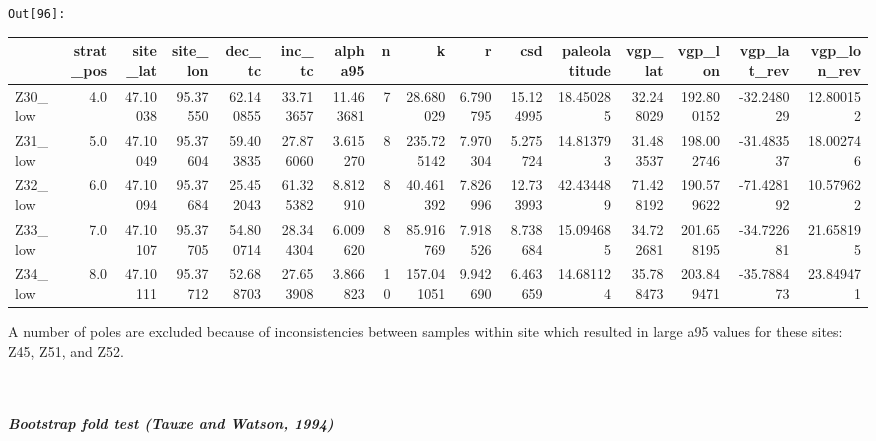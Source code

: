 \documentclass[11pt]{article}
\begin{document}
\texttt{\color{outcolor}Out[{\color{outcolor}96}]:}
\begin{sidewaystable}    
    {\tiny\begin{tabular}{lrrrrrrrrrrrrrrr}
\toprule
{} &  strat\_pos &  site\_lat &  site\_lon &     dec\_tc &     inc\_tc &    alpha95 &   n &           k &         r &        csd &  paleolatitude &    vgp\_lat &     vgp\_lon &  vgp\_lat\_rev &  vgp\_lon\_rev \\
\midrule
Z30\_low &        4.0 &  47.10038 &  95.37550 &  62.140855 &  33.713657 &  11.463681 &   7 &   28.680029 &  6.790795 &  15.124995 &      18.450285 &  32.248029 &  192.800152 &   -32.248029 &    12.800152 \\
Z31\_low &        5.0 &  47.10049 &  95.37604 &  59.403835 &  27.876060 &   3.615270 &   8 &  235.725142 &  7.970304 &   5.275724 &      14.813793 &  31.483537 &  198.002746 &   -31.483537 &    18.002746 \\
Z32\_low &        6.0 &  47.10094 &  95.37684 &  25.452043 &  61.325382 &   8.812910 &   8 &   40.461392 &  7.826996 &  12.733993 &      42.434489 &  71.428192 &  190.579622 &   -71.428192 &    10.579622 \\
Z33\_low &        7.0 &  47.10107 &  95.37705 &  54.800714 &  28.344304 &   6.009620 &   8 &   85.916769 &  7.918526 &   8.738684 &      15.094685 &  34.722681 &  201.658195 &   -34.722681 &    21.658195 \\
Z34\_low &        8.0 &  47.10111 &  95.37712 &  52.688703 &  27.653908 &   3.866823 &  10 &  157.041051 &  9.942690 &   6.463659 &      14.681124 &  35.788473 &  203.849471 &   -35.788473 &    23.849471 \\
\bottomrule
\end{tabular}}
\end{sidewaystable}
    

    A number of poles are excluded because of inconsistencies between
samples within site which resulted in large a95 values for these sites:
Z45, Z51, and Z52.



    \begin{center}
    \end{center}
    { \hspace*{\fill} \\}
    
    \subparagraph{Bootstrap fold test (Tauxe and Watson,
1994)}\label{bootstrap-fold-test-tauxe-and-watson-1994}
\end{document}
